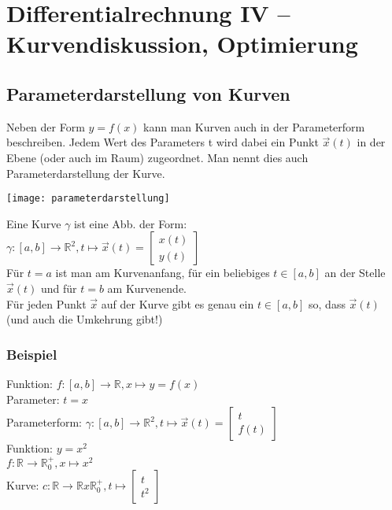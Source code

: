\documentclass[../main.tex]{subfiles}
\begin{document}

\chapter{Differentialrechnung IV -- Kurvendiskussion, Optimierung}
\section{Parameterdarstellung von Kurven}
Neben der Form $y=f(x)$ kann man Kurven auch in der Parameterform beschreiben. 
Jedem Wert des Parameters t wird dabei ein Punkt $\vec{x}(t)$ in der Ebene (oder auch im Raum) zugeordnet. 
Man nennt dies auch Parameterdarstellung der Kurve.

\begin{minipage}{0.5\textwidth}
    \texttt{[image: parameterdarstellung]}
\end{minipage} \hfill
\begin{minipage}{0.45\textwidth}
    Eine Kurve $\gamma$ ist eine Abb. der Form: \\ [7pt]
    $\gamma : [a,b] \to \mathbb{R}^2, t \mapsto \vec{x}(t)=
    \begin{bmatrix}
        x(t) \\
        y(t)
    \end{bmatrix}$ \\ [7pt]
    Für $t=a$ ist man am Kurvenanfang, für ein beliebiges $t \in [a,b]$ an der Stelle $\vec{x}(t)$ und für $t=b$ am Kurvenende. \\ [7pt]
    Für jeden Punkt $\vec{x}$ auf der Kurve gibt es genau ein $t \in [a,b]$ so, dass $\vec{x}(t)$ (und auch die Umkehrung gibt!)
\end{minipage}

\subsection{Beispiel}
Funktion: $f:[a,b] \to \mathbb{R}, x \mapsto y = f(x)$ \\
Parameter: $t=x$ \\
Parameterform: $\gamma : [a,b] \to \mathbb{R}^2, t \mapsto \vec{x}(t)=
\begin{bmatrix}
    t \\
    f(t)
\end{bmatrix}$ \\ [7pt]
Funktion: $y=x^2$ \\
$f: \mathbb{R} \to \mathbb{R}^+_0, x \mapsto x^2$ \\
Kurve: $c: \mathbb{R} \to \mathbb{R}x \mathbb{R}^+_0, t \mapsto
\begin{bmatrix}
    t \\
    t^2
\end{bmatrix}$
\end{document}
